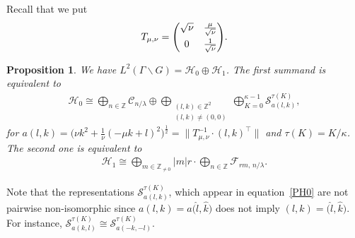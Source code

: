 \documentclass[pdftex]{sigma}
\newcommand\Z{{\mathbb Z}}
\newcommand\cC{{\mathcal C}}
\newcommand\cH{{\mathcal H}}
\newcommand\cF{{\mathcal F}}
\numberwithin{equation}{section}
\newtheorem{Proposition}[Theorem]{Proposition}
 { \theoremstyle{definition}
\newtheorem{Definition}[Theorem]{Definition}
\newtheorem{Note}[Theorem]{Note}
\newtheorem{Example}[Theorem]{Example}
\newtheorem{Remark}[Theorem]{Remark} }
\begin{document}
Recall that we put
\begin{gather}\label{Tmunu2}
T_{\mu,\nu}=\begin{pmatrix} \sqrt\nu&\frac{\mu}{\sqrt\nu}\vspace{1mm}\\0&\frac 1{\sqrt\nu} \end{pmatrix}\!.
\end{gather}


\begin{Proposition} \label{PH0H1}We have $L^2(\Gamma\backslash G)=\cH_0 \oplus \cH_1$. The first summand is equivalent to
\begin{gather}
\cH_0\cong\bigoplus_{n\in\Z} \cC_{n/\lambda} \oplus \bigoplus _{\substack{(l,k)\in\Z^2\\(l,k)\not=(0,0)}} \bigoplus_{K=0}^{\kappa-1} {\mathcal S}_{a(l,k)}^{\tau(K)}, \label{PH0}
\end{gather}
for $a(l,k)= \big(\nu k^2 +\frac1\nu(-\mu k+l)^2\big)^{\frac12}=\big\|T_{\mu,\nu}^{-1}\cdot(l,k)^\top\big\|$ and $\tau(K)=K/\kappa$.
The second one is equivalent to
\begin{gather}
\cH_1\cong\bigoplus_{m\in \Z_{\not=0}} |m|r\cdot \bigoplus_{n\in\Z} \cF_{rm,\,n/\lambda}. \label{PH1}
\end{gather}
\end{Proposition}

\begin{Remark}\label{R73}
Note that the representations ${\mathcal S}_{a(l,k)}^{\tau(K)}$, which appear in equation~\eqref{PH0} are not pairwise non-isomorphic since $a(l,k)=a\big(\hat l,\hat k\big)$ does not imply $(l,k)=\big(\hat l,\hat k\big)$. For instance,
${\mathcal S}_{a(k,l)}^{\tau(K)}\cong {\mathcal S}_{a(-k,-l)}^{\tau(K)}$.
\end{Remark}
\end{document}
